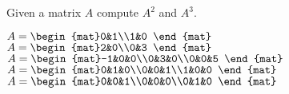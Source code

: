 
\begin{Exercise}[
name={},
title={}, 
difficulty=0,
origin={\cite{GH}}]
Given a matrix $A$ compute $A^2$ and $A^3$.
\begin{multicols}{2}
\Question $A=\begin{mat}0&1\\1&0 \end{mat}$
\Question $A=\begin{mat}2&0\\0&3 \end{mat}$
\Question $A=\begin{mat}-1&0&0\\0&3&0\\0&0&5 \end{mat}$
\Question $A=\begin{mat}0&1&0\\0&0&1\\1&0&0 \end{mat}$
\Question $A=\begin{mat}0&0&1\\0&0&0\\0&1&0 \end{mat}$
\EndCurrentQuestion
\end{multicols}

\end{Exercise}

